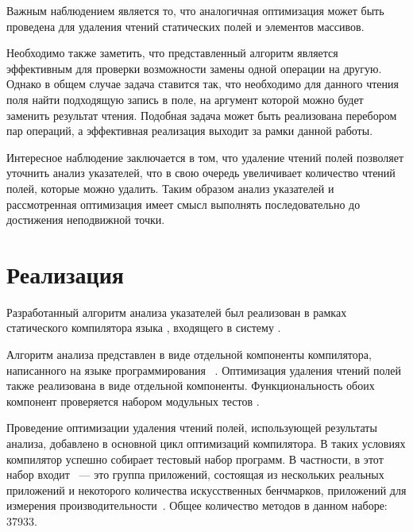 \documentclass[14pt,titlepage,draft]{extarticle}
\newcommand{\java}{\eng{Java}\xspace}
\begin{document}
    Важным наблюдением является то, что аналогичная оптимизация может быть
    проведена для удаления чтений статических полей и элементов массивов.

    Необходимо также заметить, что представленный алгоритм является эффективным
    для проверки возможности замены одной операции на другую. Однако в общем
    случае задача ставится так, что необходимо для данного чтения поля найти
    подходящую запись в поле, на аргумент которой можно будет заменить
    результат чтения. Подобная задача может быть реализована перебором пар
    операций, а эффективная реализация выходит за рамки данной работы.

    Интересное наблюдение заключается в том, что удаление чтений полей позволяет
    уточнить анализ указателей, что в свою очередь увеличивает количество
    чтений полей, которые можно удалить. Таким образом анализ указателей и
    рассмотренная оптимизация имеет смысл выполнять последовательно до
    достижения неподвижной точки.

  \section{Реализация}

    Разработанный алгоритм анализа указателей был реализован в рамках
    статического компилятора языка \java, входящего в систему .

    Алгоритм анализа представлен в виде отдельной компоненты компилятора,
    написанного на языке программирования ~\cite{scala_lang}.
    Оптимизация удаления чтений полей также реализована в виде отдельной
    компоненты. Функциональность обоих компонент проверяется набором модульных
    тестов .

    Проведение оптимизации удаления чтений полей, использующей результаты
    анализа, добавлено в основной цикл оптимизаций компилятора.
    В таких условиях компилятор успешно собирает тестовый набор \java программ.
    В частности, в этот набор входит ~--- это группа
    приложений, состоящая из нескольких реальных приложений и некоторого
    количества искусственных бенчмарков, приложений для измерения
    производительности~\cite{spec_jvm2008}. Общее количество методов в данном
    наборе: \num{37933}.
\end{document}
